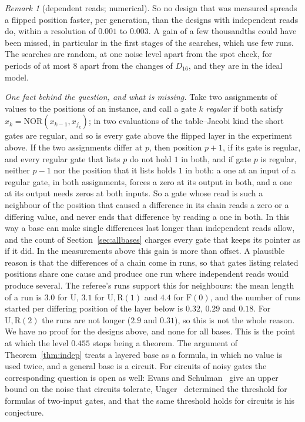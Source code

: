 \documentclass[11pt]{amsart}
\theoremstyle{definition}
\theoremstyle{remark}
\newtheorem{remark}[theorem]{Remark}
\newcommand{\NOR}{\mathrm{NOR}}
\begin{document}
\begin{remark}[dependent reads; numerical]
So no design that was measured spreads a flipped position faster, per generation, than the
designs with independent reads do, within a resolution of $0.001$ to $0.003$. A gain of a few
thousandths could have been missed, in particular in the first stages of the searches, which use
few runs. The searches are random, at one noise level apart from the spot check, for periods of
at most $8$ apart from the changes of $D_{16}$, and they are in the ideal model.

\emph{One fact behind the question, and what is missing.} Take two assignments of values to the
positions of an instance, and call a gate $k$ \emph{regular} if both satisfy
$x_k=\NOR(x_{k-1},x_{j_k})$; in two evaluations of the table--Jacobi kind the short gates are
regular, and so is every gate above the flipped layer in the experiment above. If the two
assignments differ at $p$, then position $p+1$, if its gate is regular, and every regular gate
that lists $p$ do not hold $1$ in both, and if gate $p$ is regular, neither $p-1$ nor the
position that it lists holds $1$
in both: a one at an input of a regular gate, in both assignments, forces a zero at its output in
both, and a one at its output needs zeros at both inputs. So a gate whose read is such a
neighbour of the position that caused a difference in its chain reads a zero or a differing
value, and never ends that difference by reading a one in both. In this way a base can make single
differences last longer than independent reads allow, and the count of Section~\ref{sec:allbases}
charges every gate that keeps its pointer as if it did. In the measurements above this gain is
more than offset. A plausible reason is that the differences of a chain come in runs, so that
gates listing related positions share one cause and produce one run where independent reads
would produce several. The referee's runs support this for neighbours: the mean length of a run
is $3.0$ for $\mathrm U$, $3.1$ for $\mathrm U,\mathrm R(1)$ and $4.4$ for $\mathrm F(0)$, and
the number of runs started per differing position of the layer below is $0.32$, $0.29$ and
$0.18$. For $\mathrm U,\mathrm R(2)$ the runs are not longer ($2.9$ and $0.31$), so this is not
the whole reason. We have no proof for the designs above, and none for all bases.
This is the point at which the level $0.455$ stops being a theorem. The argument of
Theorem~\ref{thm:indep} treats a layered base as a formula, in which no value is used twice, and
a general base is a circuit. For circuits of noisy gates the corresponding question is open as
well: Evans and Schulman~\cite{evansschulman} give an upper bound on the noise that circuits
tolerate, Unger~\cite{unger} determined the threshold for formulas of two-input gates, and that
the same threshold holds for circuits is his conjecture.


\end{remark}
\end{document}
